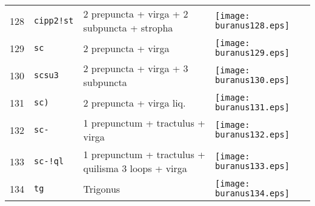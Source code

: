 \documentclass{scrarticle}
\begin{document}
\begin{longtable}{l|l|l|l}
128 & \texttt{cipp2!st} & 2 prepuncta + virga + 2 subpuncta + stropha & \texttt{[image: buranus128.eps]} \\
129 & \texttt{sc} & 2 prepuncta + virga & \texttt{[image: buranus129.eps]} \\
130 & \texttt{scsu3} & 2 prepuncta + virga + 3 subpuncta & \texttt{[image: buranus130.eps]} \\
131 & \texttt{sc)} & 2 prepuncta + virga liq. & \texttt{[image: buranus131.eps]} \\
132 & \texttt{sc-} & 1 prepunctum + tractulus + virga & \texttt{[image: buranus132.eps]} \\
133 & \texttt{sc-!ql} & 1 prepunctum + tractulus + quilisma 3 loops + virga & \texttt{[image: buranus133.eps]} \\
134 & \texttt{tg} & Trigonus & \texttt{[image: buranus134.eps]} \\\end{longtable}
\end{document}
